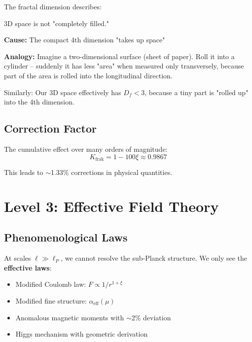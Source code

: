 	The fractal dimension describes:
	
	\begin{philosophical}[Meaning of $D_f < 3$]
		3D space is not "completely filled."
		
		\vspace{0.3cm}
		
		\textbf{Cause:} The compact 4th dimension "takes up space"
		
		\vspace{0.3cm}
		
		\textbf{Analogy:}
		Imagine a two-dimensional surface (sheet of paper). Roll it into a cylinder -- suddenly it has less "area" when measured only transversely, because part of the area is rolled into the longitudinal direction.
		
		Similarly: Our 3D space effectively has $D_f < 3$, because a tiny part is "rolled up" into the 4th dimension.
	\end{philosophical}
	
	\subsection{Correction Factor}
	
	The cumulative effect over many orders of magnitude:
	\begin{equation}
		K_{\text{frak}} = 1 - 100\xi \approx 0.9867
	\end{equation}
	
	This leads to $\sim$1.33\% corrections in physical quantities.
	
	\section{Level 3: Effective Field Theory}
	
	\subsection{Phenomenological Laws}
	
	At scales $\ell \gg \ell_P$, we cannot resolve the sub-Planck structure. We only see the \textbf{effective laws}:
	
	\begin{itemize}
		\item Modified Coulomb law: $F \propto 1/r^{1+\xi}$
		\item Modified fine structure: $\alpha_{\text{eff}}(\mu)$
		\item Anomalous magnetic moments with $\sim$2\% deviation
		\item Higgs mechanism with geometric derivation
	\end{itemize}
	
